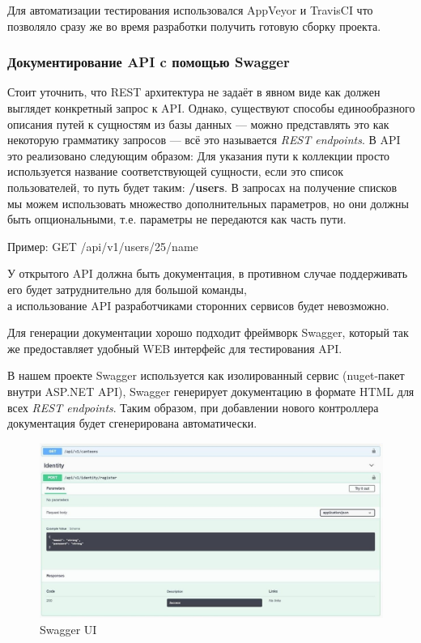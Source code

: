 \documentclass[14pt]{matmex-diploma-custom}
\begin{document}
	        Для автоматизации тестирования использовался AppVeyor и TravisCI что позволяло сразу же во время разработки получить готовую сборку проекта.

	    \subsubsection{Документирование API c помощью Swagger}
	        Стоит уточнить, что REST архитектура не задаёт в явном виде как должен выглядет конкретный запрос к API.
	        Однако, существуют способы единообразного описания путей к сущностям из базы данных — можно представлять это как некоторую грамматику запросов — всё это называется \textit{REST endpoints}. В API это реализовано следующим образом:
	        Для указания пути к коллекции просто используется название соответствующей сущности, если это список пользователей, то путь будет таким: \textbf{/users}.
	        В запросах на получение списков мы можем использовать множество дополнительных параметров, но они должны быть опциональными, т.е. параметры не передаются как часть пути.

	        Пример: \textrm{GET /api/v1/users/25/name}

	        У открытого API должна быть документация, в противном случае поддерживать его будет затруднительно для большой команды, \\ а использование API разработчиками сторонних сервисов будет невозможно.

	        Для генерации документации хорошо подходит фреймворк Swagger, который так же предоставляет удобный WEB интерфейс для тестирования API.

	        В нашем проекте Swagger используется как изолированный сервис (nuget-пакет внутри ASP.NET API), Swagger генерирует документацию в формате HTML для всех \textit{REST endpoints}.
	        Таким образом, при добавлении нового контроллера документация будет сгенерирована автоматически.
	        \begin{figure}
	            \flushleft
	            \includegraphics[scale=0.35]{images/swagger_01.jpg}
	            \caption{Swagger UI}
	            \label{swagger_01}
	        \end{figure}
\end{document}

